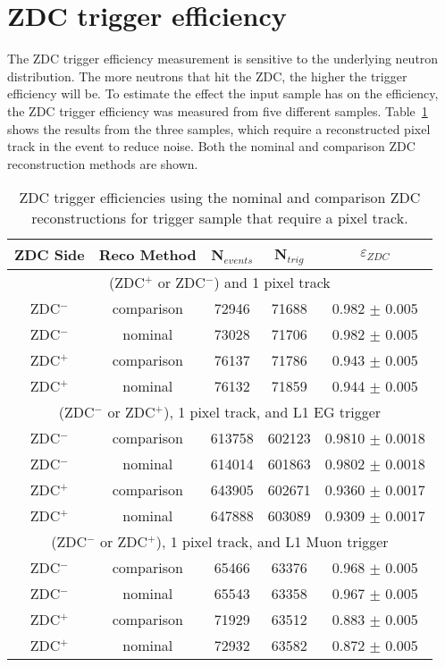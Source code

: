   \section{ZDC trigger efficiency}
    The ZDC trigger efficiency measurement is sensitive to the underlying 
      neutron distribution.
    The more neutrons that hit the ZDC, the higher the trigger efficiency 
      will be.
    To estimate the effect the input sample has on the efficiency, the ZDC 
      trigger efficiency was measured from five different samples.
    Table~\ref{tab:zdcEfficiencySys} shows the results from the 
      three samples, which require a reconstructed pixel track in the event to 
      reduce noise. 
    Both the nominal and comparison ZDC reconstruction methods are shown.
    \begin{table}
      \centering
      \begin{tabular}{|c|c|c|c|c|}
        \hline ZDC Side & Reco Method & N$_{events}$ & N$_{trig}$ & $\varepsilon_{ZDC}$ \\ \hline
         \multicolumn{5}{|c|}{(ZDC$^{+}$ or ZDC$^{-}$) and 1 pixel track} \\ \hline 
         ZDC$^{-}$ & comparison & 72946  & 71688 & 0.982 $\pm$ 0.005 \\ \hline
         ZDC$^{-}$ & nominal & 73028  & 71706  & 0.982  $\pm$ 0.005  \\ \hline
         ZDC$^{+}$ & comparison & 76137  & 71786  & 0.943  $\pm$ 0.005  \\ \hline
         ZDC$^{+}$ & nominal & 76132  & 71859  & 0.944  $\pm$ 0.005  \\ \hline
         \multicolumn{5}{|c|}{(ZDC$^{-}$ or ZDC$^{+}$), 1 pixel track, and L1 EG trigger } \\ \hline 
         ZDC$^{-}$ & comparison & 613758  & 602123  & 0.9810 $\pm$ 0.0018 \\ \hline
         ZDC$^{-}$ & nominal & 614014  & 601863  & 0.9802 $\pm$ 0.0018 \\ \hline
         ZDC$^{+}$ & comparison & 643905  & 602671  & 0.9360  $\pm$ 0.0017 \\ \hline
         ZDC$^{+}$ & nominal & 647888  & 603089  & 0.9309  $\pm$ 0.0017 \\ \hline
         \multicolumn{5}{|c|}{(ZDC$^{-}$ or ZDC$^{+}$), 1 pixel track, and L1 Muon trigger} \\ \hline 
         ZDC$^{-}$ & comparison & 65466  & 63376  & 0.968 $\pm$ 0.005  \\ \hline
         ZDC$^{-}$ & nominal & 65543  & 63358  & 0.967 $\pm$ 0.005 \\ \hline
         ZDC$^{+}$ & comparison & 71929  & 63512  & 0.883  $\pm$ 0.005 \\ \hline
         ZDC$^{+}$ & nominal & 72932  & 63582  & 0.872  $\pm$ 0.005 \\ \hline
       \end{tabular}
      \caption{ZDC trigger efficiencies using  the nominal and comparison 
        ZDC reconstructions for trigger sample that require a pixel track.}
      \label{tab:zdcEfficiencySys}
    \end{table}

